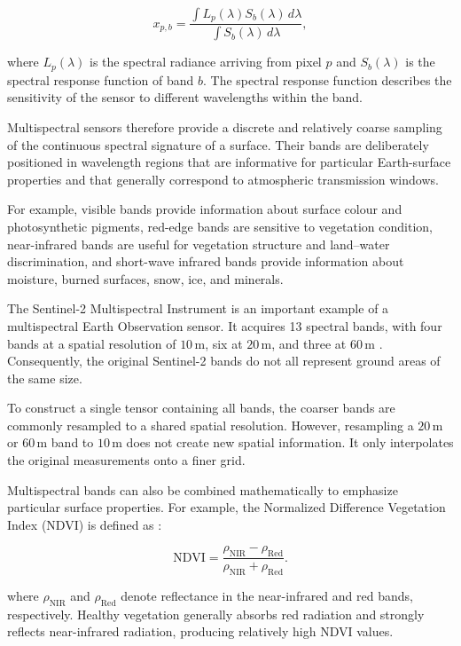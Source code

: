 \documentclass[11pt,a4paper]{article}
\begin{document}
\[
x_{p,b}
=
\frac{
    \displaystyle
    \int L_p(\lambda)S_b(\lambda)\,d\lambda
}{
    \displaystyle
    \int S_b(\lambda)\,d\lambda
},
\]

where \(L_p(\lambda)\) is the spectral radiance arriving from pixel \(p\)
and \(S_b(\lambda)\) is the spectral response function of band \(b\).
The spectral response function describes the sensitivity of the sensor
to different wavelengths within the band.

Multispectral sensors therefore provide a discrete and relatively coarse
sampling of the continuous spectral signature of a surface. Their bands
are deliberately positioned in wavelength regions that are informative
for particular Earth-surface properties and that generally correspond to
atmospheric transmission windows.

For example, visible bands provide information about surface colour and
photosynthetic pigments, red-edge bands are sensitive to vegetation
condition, near-infrared bands are useful for vegetation structure and
land--water discrimination, and short-wave infrared bands provide
information about moisture, burned surfaces, snow, ice, and minerals.

The Sentinel-2 Multispectral Instrument is an important example of a
multispectral Earth Observation sensor. It acquires 13 spectral bands,
with four bands at a spatial resolution of \(10\,\mathrm{m}\), six at
\(20\,\mathrm{m}\), and three at \(60\,\mathrm{m}\)
\cite{esa_sentinel2_msi}. Consequently, the original Sentinel-2 bands do
not all represent ground areas of the same size.

To construct a single tensor containing all bands, the coarser bands are
commonly resampled to a shared spatial resolution. However, resampling a
\(20\,\mathrm{m}\) or \(60\,\mathrm{m}\) band to \(10\,\mathrm{m}\)
does not create new spatial information. It only interpolates the
original measurements onto a finer grid.

Multispectral bands can also be combined mathematically to emphasize
particular surface properties. For example, the Normalized Difference Vegetation Index (NDVI) is defined as
\cite{rouse1974monitoring}:

\[
\mathrm{NDVI}
=
\frac{\rho_{\mathrm{NIR}}-\rho_{\mathrm{Red}}}
     {\rho_{\mathrm{NIR}}+\rho_{\mathrm{Red}}}.
\]

where \(\rho_{\mathrm{NIR}}\) and \(\rho_{\mathrm{Red}}\) denote
reflectance in the near-infrared and red bands, respectively. Healthy
vegetation generally absorbs red radiation and strongly reflects
near-infrared radiation, producing relatively high NDVI values.
\end{document}
